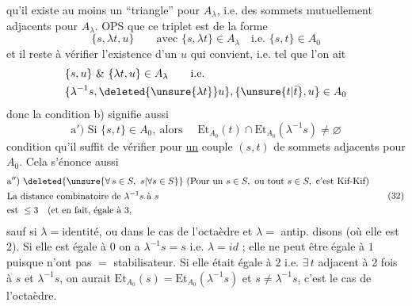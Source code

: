qu'il existe au moins un ``triangle'' pour $A_\lambda$, i.e.  des sommets  mutuellement adjacents pour $A_\lambda$.  OPS que ce triplet est  de la forme
\[
\{s,\lambda t,u\}\qquad \text{avec }\{s,\lambda t\}\in A_\lambda\quad\text{i.e. }\{s,t\}\in A_0
\]
et il reste à  vérifier l'existence d'un $u$ qui convient, i.e. tel que l'on ait
\[
\begin{aligned}
&\{s,u\}\ \&\ \{\lambda t,u\}\in A_\lambda\qquad\text{i.e.}\\
&\{\lambda^{-1}s,\deleted{\unsure{\lambda t}}u\},\{\unsure{t|\bar t},u\}\in A_0
\end{aligned}
\]
donc la condition b) signifie aussi
\[
\text{a$'$) Si }\{s,t\}\in A_0,\ \text{alors }\quad
\mathrm{Et}_{A_0}(t)\cap\mathrm{Et}_{A_0}(\lambda^{-1}s)\ne\varnothing \tag*{(31)}
\]
condition qu'il suffit de vérifier pour \uline{un} couple $(s,t)$ de sommets adjacents pour $A_0$. Cela s'énonce aussi 
\[
\begin{aligned}
&\text{a$''$) }\deleted{\unsure{\forall\,s\in S,\ s|\forall s\in S}}\ \text{(Pour un }s\in S,\ \text{ou tout }s\in S,\ \text{c'est Kif-Kif)}\\
&\text{La distance combinatoire de }\lambda^{-1}s\text{ à }s\\
&\text{est }\leq 3\quad\text{(et en fait, égale à 3,}
\end{aligned}\tag*{(32)}
\]
sauf si $\lambda=\text{identité}$,  ou dans le cas de l'octaèdre et $\lambda=$  antip. disons (où elle est $2$).
Si elle est égale à $0$ on a $\lambda^{-1}s=s$ i.e. $\lambda=id$ ; elle ne peut être égale à $1$ puisque   n'ont pas $=$ stabilisateur. Si elle était égale à $2$ i.e.  $\exists\,t$ adjacent à 2 fois à $s$ et $\lambda^{-1}s$, on aurait $\mathrm{Et}_{A_0}(s)=\mathrm{Et}_{A_0}(\lambda^{-1}s)$ et $s\ne\lambda^{-1}s$, c'est le cas de l'octaèdre.

